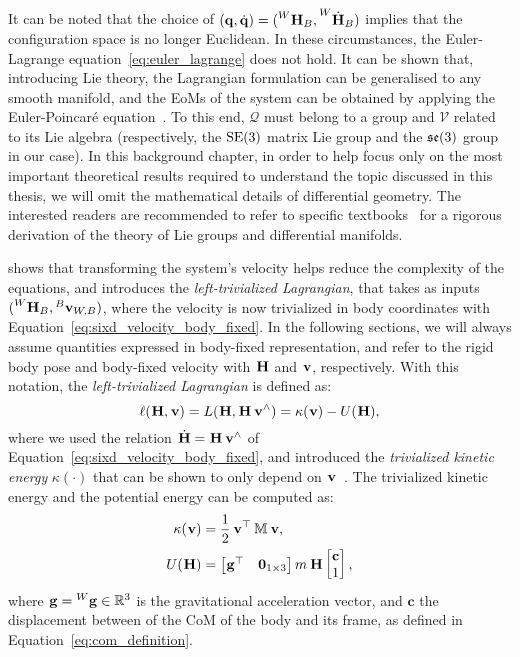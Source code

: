\begin{remark*}
%
It can be noted that the choice of $(\Qu, \Qud) = (\homo[W]_B, \homod[W]_B)$ implies that the configuration space is no longer Euclidean.
In these circumstances, the Euler-Lagrange equation~\eqref{eq:euler_lagrange} does not hold.
It can be shown that, introducing Lie theory, the Lagrangian formulation can be generalised to any smooth manifold, and the \acp{EoM} of the system can be obtained by applying the Euler-Poincaré equation~\parencite{marsden_jerrold_e_introduction_2013, maruskin_dynamical_2018}.
To this end, $\mathcal{Q}$ must belong to a group and $\mathcal{V}$ related to its Lie algebra (respectively, the $\SE(3)$ matrix Lie group and the $\se(3)$ group in our case).
In this background chapter, in order to help focus only on the most important theoretical results required to understand the topic discussed in this thesis, we will omit the mathematical details of differential geometry.
The interested readers are recommended to refer to specific textbooks~\parencite{warner_foundations_1983, selig_geometric_2005} for a rigorous derivation of the theory of Lie groups and differential manifolds.
%
\end{remark*}
%
\textcite{traversaro_modelling_2017} shows that transforming the system's velocity helps reduce the complexity of the equations, and introduces the \emph{left-trivialized Lagrangian}, that takes as inputs $(\homo[W]_B, \velsix[B]_{W,B})$, where the velocity is now trivialized in body coordinates with Equation~\eqref{eq:sixd_velocity_body_fixed}.
In the following sections, we will always assume quantities expressed in body-fixed representation, and refer to the rigid body pose and body-fixed velocity with $\homo$ and $\velsix$, respectively.
With this notation, the \emph{left-trivialized Lagrangian} is defined as:
%
\begin{equation}
    \label{eq:left_trivialized_lagrangian}
    \ell(\homo, \velsix) = L(\homo, \homo \velsix^\wedge) = \kappa(\velsix) - U(\homo)
    ,
\end{equation}
%
where we used the relation $\homod = \homo \velsix^\wedge$ of Equation~\eqref{eq:sixd_velocity_body_fixed}, and introduced the \emph{trivialized kinetic energy} $\kappa(\cdot)$ that can be shown to only depend on $\velsix$~\parencite[Remark~2.5]{traversaro_modelling_2017}.
The trivialized kinetic energy and the potential energy can be computed as:
%
\begin{align}
    \label{eq:kinetic_and_potential_energies}
    \kappa(\velsix) &= \frac{1}{2} \velsix^\top \masssix \velsix , \\
    U(\homo) &=
    \begin{bmatrix}\gravity^\top & \zeros_{1\times3}\end{bmatrix}
    m \homo
    \begin{bmatrix}\mathbf{c} \\ 1 \end{bmatrix}
    ,
\end{align}
%
where $\gravity = \gravity[W] \in \realn^3$ is the gravitational acceleration vector, and $\mathbf{c}$ the displacement between of the \ac{CoM} of the body and its frame, as defined in Equation~\eqref{eq:com_definition}.

